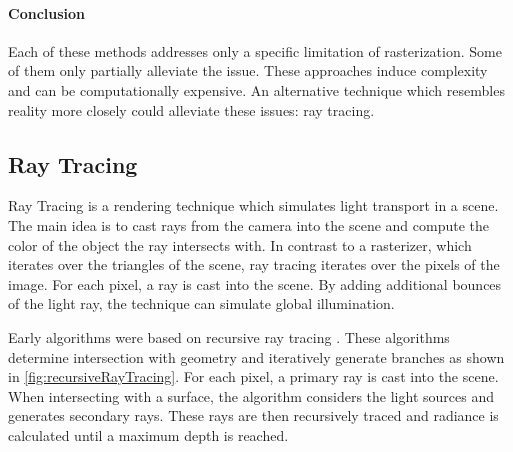 \paragraph{Conclusion}

Each of these methods addresses only a specific limitation of rasterization. Some of them only partially alleviate the issue. These approaches induce complexity and can be computationally expensive. An alternative technique which resembles reality more closely could alleviate these issues: ray tracing.

\subsection{Ray Tracing}
\label{ch:rayTracingTheory}

Ray Tracing is a rendering technique which simulates light transport in a scene. The main idea is to cast rays from the camera into the scene and compute the color of the object the ray intersects with. In contrast to a rasterizer, which iterates over the triangles of the scene, ray tracing iterates over the pixels of the image. For each pixel, a ray is cast into the scene. By adding additional bounces of the light ray, the technique can simulate global illumination.

Early algorithms were based on recursive ray tracing \cite{whittedGlobalIllumination}. These algorithms determine intersection with geometry and iteratively generate branches as shown in \autoref{fig:recursiveRayTracing}. For each pixel, a primary ray is cast into the scene. When intersecting with a surface, the algorithm considers the light sources and generates secondary rays. These rays are then recursively traced and radiance is calculated until a maximum depth is reached.

